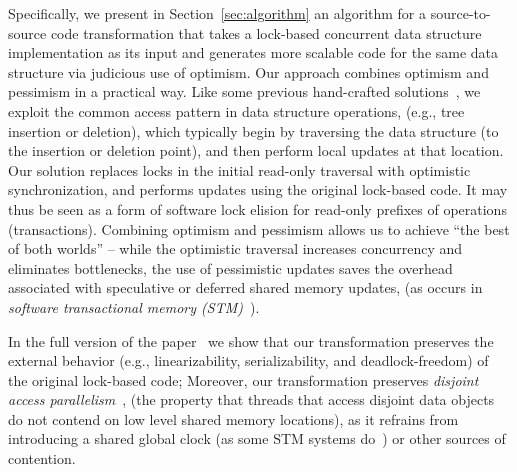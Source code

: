 Specifically, we present in Section~\ref{sec:algorithm} an algorithm for a source-to-source
code transformation that takes a lock-based concurrent data structure implementation as its input
and generates more scalable code for the same data structure via judicious use of optimism.
Our approach combines optimism and pessimism in a practical way.
Like some previous hand-crafted solutions~\cite{LazyList}, 
we exploit the common access pattern in data structure operations,
(e.g., tree insertion or deletion), which typically begin by traversing the data structure (to the insertion or deletion point), and then perform local updates at that location.
Our solution replaces locks in the initial read-only traversal with optimistic synchronization, and performs updates using the original lock-based code. It
may thus be seen as a form of software lock elision for read-only prefixes of operations (transactions).
%
Combining optimism and pessimism allows us to achieve ``the best of both worlds'' -- 
while the
optimistic traversal increases concurrency and eliminates bottlenecks,
the use of pessimistic updates saves the overhead associated with speculative or deferred shared
memory updates, (as occurs in \emph{software transactional memory (STM)}~\cite{HLR:SLCA2010}).
%


In the full version of the paper~\cite{} we show that our transformation preserves the external behavior (e.g., linearizability, serializability, and deadlock-freedom) of the original lock-based code; %
Moreover, our transformation preserves 
\emph{disjoint access parallelism}~\cite{Israeli:1994:DIS:197917.198079}, (the property that threads 
that access disjoint data objects do not contend on low level shared memory locations), as it
refrains from introducing a shared global clock (as some STM systems do~\cite{DBLP:conf/eurosys/ShalevS06}) or other sources of contention. 


